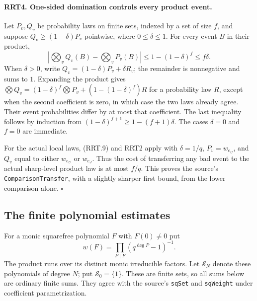 \documentclass[11pt,a4paper]{article}
\numberwithin{equation}{section}
\theoremstyle{remark}\newtheorem{remark}[theorem]{Remark}
\begin{document}
\paragraph{RRT4. One-sided domination controls every product event.}
\label{claim:RRT4}
Let $P_v,\allowbreak{} Q_v$ be probability laws on finite sets, indexed by a
set of size $f$, and suppose $Q_v\ge(1-\delta)P_v$ pointwise,
where $0\le\delta\le1$.  For every event $B$ in their product,
\[
 \left|\bigotimes_v Q_v(B)-\bigotimes_v P_v(B)\right|
       \le1-(1-\delta)^f\le f\delta.
 \tag{RRT.13}
\]
When $\delta>0$, write
$Q_v=(1-\delta)P_v+\delta R_v$; the remainder is nonnegative
and sums to $1$.  Expanding the product gives
$\bigotimes Q_v=(1-\delta)^f\bigotimes P_v+
(1-(1-\delta)^f)R$ for a probability law $R$, except when the
second coefficient is zero, in which case the two laws already
agree.  Their event probabilities differ by at most that
coefficient.  The last inequality follows by induction from
$(1-\delta)^{f+1}\ge1-(f+1)\delta$.  The cases $\delta=0$ and
$f=0$ are immediate.

For the actual local laws, (RRT.9) and RRT2 apply with
$\delta=1/q$, $P_v=w_{e_U}$, and $Q_v$ equal to either
$w_{e_U}$ or $w_{e_J}$.  Thus the cost of transferring any bad
event to the actual sharp-level product law is at most $f/q$.
This proves the source's \texttt{Comparison\allowbreak Transfer}, with a
slightly sharper first bound, from the lower comparison alone.
\hfill$\square$

\subsection{The finite polynomial estimates}

For a monic squarefree polynomial $F$ with $F(0)\ne0$ put
\[
           w(F)=\prod_{P\mid F}(q^{\deg P}-1)^{-1}.
 \tag{RRT.14}
\]
The product runs over its distinct monic irreducible factors.
Let $\mathcal S_N$ denote these polynomials of degree $N$; put
$\mathcal S_0=\{1\}$.  These are finite sets, so all sums below
are ordinary finite sums.  They agree with the source's
\texttt{sq\allowbreak Set} and \texttt{sq\allowbreak Weight} under coefficient
parametrization.

\end{document}
